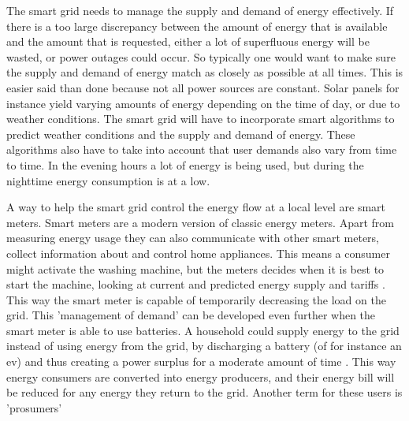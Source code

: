 

The smart grid needs to manage the supply and demand of energy effectively. If there is a too large discrepancy between the amount of energy that is available and the amount that is requested, either a lot of superfluous energy will be wasted, or power outages could occur. 
So typically one would want to make sure the supply and demand of energy match as closely as possible at all times. This is easier said than done because not all power sources are constant. Solar panels for instance yield varying amounts of energy depending on the time of day, or due to weather conditions. The smart grid will have to incorporate smart algorithms to predict weather conditions and the supply and demand of energy. These algorithms also have to take into account that user demands also vary from time to time. In the evening hours a lot of energy is being used, but during the nighttime energy consumption is at a low.

A way to help the smart grid control the energy flow at a local level are smart meters. Smart meters are a modern version of classic energy meters. Apart from measuring energy usage they can also communicate with other smart meters, collect information about and control home appliances. This means a consumer might activate the washing machine, but the meters decides when it is best to start the machine, looking at current and predicted energy supply and tariffs  \cite{DepuruWangDevabhaktuni2011a}. This way the smart meter is capable of temporarily decreasing the load on the grid. This 'management of demand' can be developed even further when the smart meter is able to use batteries. A household could supply energy to the grid instead of using energy from the grid, by discharging a battery (of for instance an \gls{ev}) and thus creating a power surplus for a moderate amount of time \cite{MwasiluJustoKimEtAl2014}. This way energy consumers are converted into energy producers, and their energy bill will be reduced for any energy they return to the grid. Another term for these users is 'prosumers'

